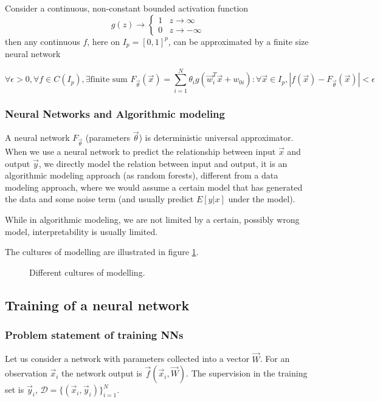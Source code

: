 Consider a continuous, non-constant bounded activation function
\begin{equation}
    g(z) \rightarrow \begin{cases}
        1 & z \rightarrow \infty \\
        0 & z \rightarrow -\infty
    \end{cases}
\end{equation}
then any continuous $f$, here on $I_p = [0,1]^p$, can be approximated by a finite size
neural network

\begin{equation}
    \forall \epsilon > 0, \forall f \in C(I_p), \exists \text{finite sum } F_\vec{\theta}(\vec{x}) = \sum_{i=1}^{N} \theta_i g(\vec{w}_i^T \vec{x} + w_{0i}): \forall \vec{x} \in I_p, |f(\vec{x}) - F_\vec{\theta}(\vec{x})| < \epsilon
\end{equation}

\subsubsection{Neural Networks and Algorithmic modeling}
A neural network $F_\vec{\theta}$ (parameters $\vec{\theta}$) is deterministic universal
approximator. When we use a neural network to predict the relationship between input $\vec{x}$
and output $\vec{y}$, we directly model the relation between input and output, it is an algorithmic
modeling approach (as random forests), different from a data modeling approach, where we would assume a certain
model that has generated the data and some noise term \citep{breiman01} (and usually predict $E[y|x]$ under the model).

While in algorithmic modeling, we are not limited by a certain, possibly wrong model, interpretability
is usually limited.

The cultures of modelling are illustrated in figure \ref{fig:modelling_cultures}.

\begin{figure}[!htb]
    \centering
    
    \caption{Different cultures of modelling.}
    \label{fig:modelling_cultures}
\end{figure}

\subsection{Training of a neural network}

\subsubsection{Problem statement of training NNs}
Let us consider a network with parameters collected into a vector $\vec{W}$.
For an observation $\vec{x}_i$ the network output is $\vec{f}(\vec{x}_i, \vec{W})$.
The supervision in the training set is $\vec{y}_i$, $\mathcal{D} = \{ (\vec{x}_i, \vec{y}_i) \}_{i=1}^{N}$.

